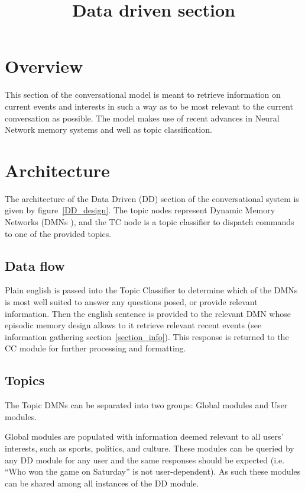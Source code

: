 \documentclass[12pt]{article}
\title{Data driven section}
\author{}
\date{} %
\begin{document}
\maketitle

\section{Overview}
This section of the conversational model is meant to retrieve information on current events and interests in such a way as to be most relevant to the current conversation as possible. The model makes use of recent advances in Neural Network memory systems and well as topic classification.

\section{Architecture}
The architecture of the Data Driven (DD) section of the conversational system is given by figure~\ref{DD_design}. The topic nodes represent Dynamic Memory Networks (DMNs \cite{Kumar:2015ys}), and the TC node is a topic classifier to dispatch commands to one of the provided topics. 

\subsection{Data flow}
Plain english is passed into the Topic Classifier to determine which of the DMNs is most well suited to answer any questions posed, or provide relevant information. Then the english sentence is provided to the relevant DMN whose episodic memory design allows to it retrieve relevant recent events (see information gathering section~\ref{section_info}). This response is returned to the CC module for further processing and formatting.

\subsection{Topics}
The Topic DMNs can be separated into two groups: Global modules and User modules. 

\noindent
Global modules are populated with information deemed relevant to all users' interests, such as sports, politics, and culture. These modules can be queried by any DD module for any user and the same responses should be expected (i.e. ``Who won the game on Saturday'' is not user-dependent). As such these modules can be shared among all instances of the DD module.
\end{document}
